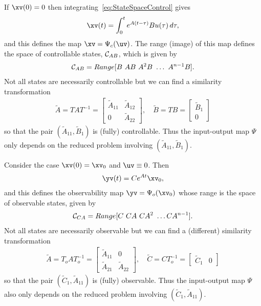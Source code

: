 \newcommand{\At}{\tilde{A}}
\newcommand{\Bt}{\tilde{B}}
\newcommand{\Ct}{\tilde{C}}
 If $\xv(0)=0$ then integrating~\ref{eq:StateSpaceControl}
gives
\begin{align}
    \xv(t) = \int_0^t e^{A(t-\tau)} B u (\tau) \,d\tau,
\end{align}
and this defines the map $\xv = \Psi_c(\uv)$. 
The range (image) of this map defines the space of controllable states, $\mathcal{C}_{AB}$, 
which is given by
\begin{align}
   \mathcal{C}_{AB} = Range[ B~ A B~ A^2 B~ \ldots ~A^{n-1} B].
\end{align}
Not all states are necessarily controllable but we can find a similarity transformation
\begin{align}
   \At = T A T^{-1} = \begin{bmatrix} \At_{11} & \At_{12} \\
                                          0     & \At_{22} \end{bmatrix}, \quad
             \Bt = T B = \begin{bmatrix} \Bt_1 \\ 0 \end{bmatrix}
\end{align}
so that the pair $(\At_{11},\Bt_1)$ is (fully) controllable. 
Thus the input-output map $\Psi$ only depends on the reduced problem involving $(\At_{11},\Bt_1)$.

 Consider the case $\xv(0)=\xv_0$ and $\uv\equiv 0$. Then
\begin{align}
    \yv(t) =  C e^{A t} \xv_0 , 
\end{align}
and this defines the observability map $\yv=\Psi_o(\xv_0)$ whose range is the space of 
observable states, given by \begin{align}
   \mathcal{C}_{CA} = Range[ C~ C A~ C A^2~ \ldots C A^{n-1}].
\end{align}
Not all states are necessarily observable but we can find a (different) similarity transformation
\begin{align}
   \At = T_o A T_o^{-1} = \begin{bmatrix} \At_{11} &  0  \\
                                      \At_{21} & \At_{22} \end{bmatrix}, \quad
             \Ct = C T_o^{-1} = \begin{bmatrix} \Ct_1 &  0 \end{bmatrix}
\end{align}
so that the pair $(\Ct_1, \At_{11})$ is (fully) observable.
Thus the input-output map $\Psi$ also only depends on the reduced problem involving $(\Ct_1, \At_{11})$.

